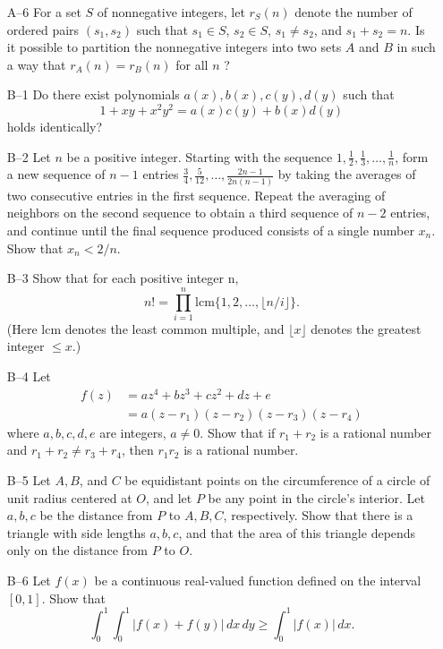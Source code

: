 \documentclass[amssymb,twocolumn,pra,10pt,aps]{revtex4-1}
\begin{document}
\begin{itemize}
\item[A--6]
For a set  $S$  of nonnegative integers, let  $r_S(n)$  denote the number of
ordered pairs  $(s_1, s_2)$  such that  $s_1 \in S$, $s_2 \in S$, $s_1 \ne
s_2$,
and  $s_1 + s_2 = n$.  Is it possible to partition the nonnegative
integers into two sets  $A$  and  $B$  in such a way that  $r_A(n) = r_B(n)$
for all  $n$ ?

\item[B--1]
Do there exist polynomials  $a(x), b(x), c(y), d(y)$  such that
\[
       1 + x y + x^2 y^2 = a(x) c(y) + b(x) d(y)
\]
holds identically?

\item[B--2]
Let  $n$  be a positive integer. Starting with the sequence
$1, \frac{1}{2}, \frac{1}{3}, \dots, \frac{1}{n}$,
form a new sequence of  $n-1$  entries
$\frac{3}{4}, \frac{5}{12}, \dots, \frac{2n-1}{2n(n-1)}$
by taking the averages of
two consecutive entries in the first sequence. Repeat the
averaging of neighbors on the second sequence to obtain a third
sequence of  $n-2$  entries, and continue until the final sequence produced
consists of a single number  $x_n$.  Show that  $x_n < 2/n$.

\item[B--3]
Show that for each positive integer  n,
\[
    n! = \prod_{i=1}^n  \mathrm{lcm}\{1, 2, \dots, \lfloor n/i\rfloor\} .
\]
(Here $\mathrm{lcm}$ denotes the least common multiple, and
$\lfloor x \rfloor$ denotes the greatest integer $\leq x$.)

\item[B--4]
Let
\begin{align*}
f(z) &= a z^4 + b z^3 + c z^2 + d z + e \\
&= a(z-r_1)(z-r_2)(z-r_3)(z-r_4)
\end{align*}
where  $a,b,c,d,e$  are integers, $a \ne 0$.  Show that if  $r_1 + r_2$  is a
rational number and $r_1 + r_2 \ne r_3 + r_4$,  then  $r_1 r_2$  is a
rational number.

\item[B--5]
Let  $A,B$, and $C$  be equidistant points on the circumference of a circle
of unit radius centered at  $O$,  and let  $P$  be any point in the circle's
interior.  Let  $a, b, c$  be the distance from  $P$  to $A, B, C$,
respectively.
Show that there is a triangle with side lengths  $a, b, c$,  and that the
area of this triangle depends only on the distance from  $P$  to  $O$.

\item[B--6]
Let  $f(x)$  be  a continuous real-valued function defined on the interval
$[0,1]$. Show that
\[
   \int_0^1 \int_0^1 | f(x) + f(y) |\,dx\,dy \geq \int_0^1 |f(x)|\,dx.
\]

\end{itemize}
\end{document}
